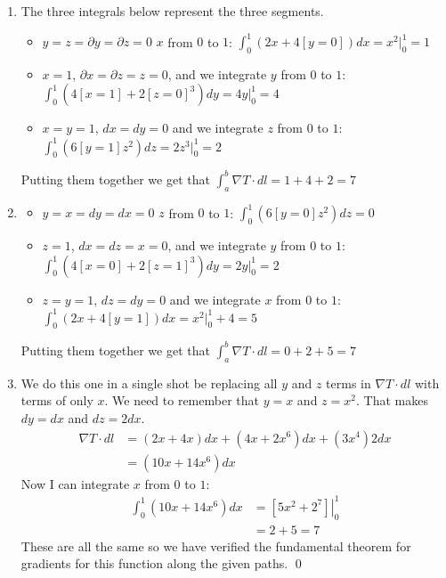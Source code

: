 \documentclass{homework}
\begin{document}
\begin{homeworkProblem}[Problem 1.32]
{  \begin{enumerate}
    \item The three integrals below represent the three segments.
      \begin{itemize}
        \item $y=z=\partial y=\partial z= 0$  $x$ from $0$ to $1$:  $\int_0^1 (2x + 4[y=0]) dx = x^2|_0^1 = 1$
        \item $x=1$, $\partial x= \partial z = z = 0$, and we integrate $y$ from $0$ to $1$: $\int_0^1  (4[x=1] + 2[z=0]^3) dy = 4y|_0^1 = 4$
        \item $x=y=1$, $dx=dy=0$ and we integrate $z$ from $0$ to  $1$: $\int_0^1 (6[y=1] z^2) dz = 2z^3|_0^1 = 2$
      \end{itemize}
      Putting them together we get that $\int_a^b \nabla T \cdot dl = 1 + 4 + 2 = 7$
    \item
       \begin{itemize}
        \item $y=x=dy=dx= 0$  $z$ from $0$ to $1$:  $\int_0^1 (6[y=0] z^2) dz =  0$
        \item $z=1$, $dx= dz = x = 0$, and we integrate $y$ from $0$ to $1$: $\int_0^1  (4[x=0] + 2[z=1]^3) dy = 2y|_0^1 = 2$
        \item $z=y=1$, $dz=dy=0$ and we integrate $x$ from $0$ to  $1$: $\int_0^1  (2x + 4[y=1]) dx = x^2|_0^
        1 + 4 = 5$
      \end{itemize}
      Putting them together we get that $\int_a^b \nabla T \cdot dl = 0 + 2 + 5 = 7$
    \item We do this one in a single shot be replacing all $y$ and $z$ terms in $\nabla T \cdot dl$ with terms of only $x$. We need to remember that $y = x$ and $z = x^2$. That makes $dy = dx$ and $dz = 2 dx$.
      \begin{align*}
        \nabla T \cdot dl &= (2x + 4x)dx + (4x + 2x^6) dx + (3x^4)2dx \\
          &= (10x + 14x^6) dx
      \end{align*}
    Now I can integrate $x$ from $0$ to  $1$:
    \begin{align*}
      \int_0^1 (10x + 14x^6) dx &= \left. \left[5x^2 + 2^7 \right] \right|_0^1 \\
        &= 2 + 5 = 7
    \end{align*}
    These are all the same so we have verified the fundamental theorem for gradients for this function along the given paths. \qed
  \end{enumerate}

  }
\end{homeworkProblem}
\end{document}
